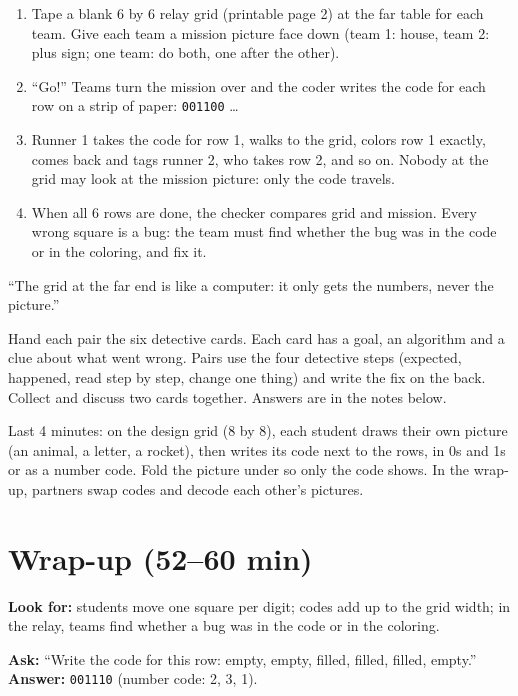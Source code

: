 \begin{unplugged}
\begin{enumerate}[leftmargin=1.4em,itemsep=1pt]
  \item Tape a blank 6 by 6 relay grid (printable page 2) at the far table for each team. Give each team a mission picture face down (team 1: house, team 2: plus sign; one team: do both, one after the other).
  \item \enquote{Go!} Teams turn the mission over and the coder writes the code for each row on a strip of paper: \texttt{001100} \ldots
  \item Runner 1 takes the code for row 1, walks to the grid, colors row 1 exactly, comes back and tags runner 2, who takes row 2, and so on. Nobody at the grid may look at the mission picture: only the code travels.
  \item When all 6 rows are done, the checker compares grid and mission. Every wrong square is a bug: the team must find whether the bug was in the code or in the coloring, and fix it.
\end{enumerate}
\enquote{The grid at the far end is like a computer: it only gets the numbers, never the picture.}
\end{unplugged}

\begin{bughunt}
Hand each pair the six detective cards. Each card has a goal, an algorithm and a clue about what went wrong. Pairs use the four detective steps (expected, happened, read step by step, change one thing) and write the fix on the back. Collect and discuss two cards together. Answers are in the notes below.
\end{bughunt}

\begin{freebuild}
Last 4 minutes: on the design grid (8 by 8), each student draws their own picture (an animal, a letter, a rocket), then writes its code next to the rows, in 0s and 1s or as a number code. Fold the picture under so only the code shows. In the wrap-up, partners swap codes and decode each other's pictures.
\end{freebuild}

\section{Wrap-up (52--60 min)}
\begin{formativecheck}
\textbf{Look for:} students move one square per digit; codes add up to the grid width; in the relay, teams find whether a bug was in the code or in the coloring.

\textbf{Ask:} \enquote{Write the code for this row: empty, empty, filled, filled, filled, empty.}
\textbf{Answer:} \texttt{001110} (number code: 2, 3, 1).
\end{formativecheck}

